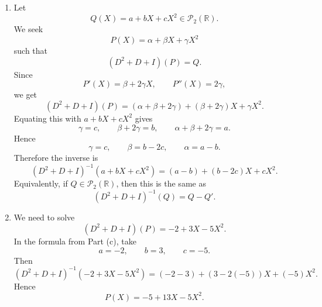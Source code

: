 \documentclass[12pt]{article}
\newcommand{\R}{\mathbb{R}}
\newcommand{\cP}{\mathcal{P}}
\begin{document}
\begin{enumerate}[label=(\alph*)]
  \item Let
  \[
    Q(X)=a+bX+cX^2\in\cP_2(\R).
  \]
  We seek
  \[
    P(X)=\alpha+\beta X+\gamma X^2
  \]
  such that
  \[
    (D^2+D+I)(P)=Q.
  \]
  Since
  \[
    P'(X)=\beta+2\gamma X,
    \qquad
    P''(X)=2\gamma,
  \]
  we get
  \[
    (D^2+D+I)(P)
    =
    (\alpha+\beta+2\gamma)+(\beta+2\gamma)X+\gamma X^2.
  \]
  Equating this with $a+bX+cX^2$ gives
  \[
    \gamma=c,\qquad
    \beta+2\gamma=b,\qquad
    \alpha+\beta+2\gamma=a.
  \]
  Hence
  \[
    \gamma=c,\qquad
    \beta=b-2c,\qquad
    \alpha=a-b.
  \]
  Therefore the inverse is
  \[
    \boxed{
    (D^2+D+I)^{-1}(a+bX+cX^2)
    =
    (a-b)+(b-2c)X+cX^2.}
  \]
  Equivalently, if $Q\in\cP_2(\R)$, then this is the same as
  \[
    (D^2+D+I)^{-1}(Q)=Q-Q'.
  \]

  \item We need to solve
  \[
    (D^2+D+I)(P)=-2+3X-5X^2.
  \]
  In the formula from Part (c), take
  \[
    a=-2,\qquad b=3,\qquad c=-5.
  \]
  Then
  \[
    (D^2+D+I)^{-1}(-2+3X-5X^2)
    =
    (-2-3)+(3-2(-5))X+(-5)X^2.
  \]
  Hence
  \[
    \boxed{P(X)=-5+13X-5X^2.}
  \]
\end{enumerate}

\newpage
\end{document}
